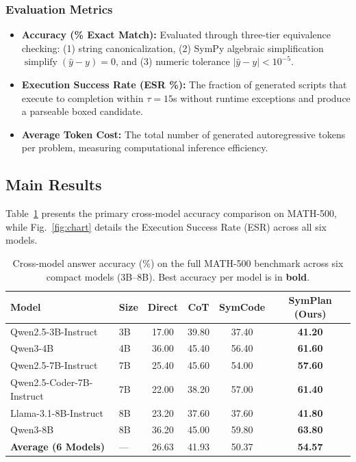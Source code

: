 \documentclass[runningheads]{llncs}
\begin{document}
\subsubsection{Evaluation Metrics}

\begin{itemize}
    \item \textbf{Accuracy (\% Exact Match):} Evaluated through three-tier equivalence checking: (1) string canonicalization, (2) SymPy algebraic simplification $\operatorname{simplify}(\hat{y} - y) = 0$, and (3) numeric tolerance $|\hat{y} - y| < 10^{-5}$.
    \item \textbf{Execution Success Rate (ESR \%):} The fraction of generated scripts that execute to completion within $\tau=15$s without runtime exceptions and produce a parseable boxed candidate.
    \item \textbf{Average Token Cost:} The total number of generated autoregressive tokens per problem, measuring computational inference efficiency.
\end{itemize}

\subsection{Main Results}
\label{sec:results}

Table~\ref{tab:mainresults} presents the primary cross-model accuracy comparison on MATH-500, while Fig.~\ref{fig:chart} details the Execution Success Rate (ESR) across all six models.

\begin{table}[t]
\centering
\caption{Cross-model answer accuracy (\%) on the full MATH-500 benchmark across six compact models (3B--8B). Best accuracy per model is in \textbf{bold}.}
\label{tab:mainresults}
\setlength{\tabcolsep}{5pt}
\small
\begin{tabular}{llcccc}
\toprule
\rowcolor{headergray}
\textbf{Model} & \textbf{Size} & \textbf{Direct} & \textbf{CoT} & \textbf{SymCode} & \textbf{SymPlan (Ours)} \\
\midrule
Qwen2.5-3B-Instruct & 3B & 17.00 & 39.80 & 37.40 & \textbf{41.20} \\
Qwen3-4B & 4B & 36.00 & 45.40 & 56.40 & \textbf{61.60} \\
Qwen2.5-7B-Instruct & 7B & 25.40 & 45.60 & 54.00 & \textbf{57.60} \\
Qwen2.5-Coder-7B-Instruct & 7B & 22.00 & 38.20 & 57.00 & \textbf{61.40} \\
Llama-3.1-8B-Instruct & 8B & 23.20 & 37.60 & 37.60 & \textbf{41.80} \\
Qwen3-8B & 8B & 36.20 & 45.00 & 59.80 & \textbf{63.80} \\
\midrule
\rowcolor{ourgreen}
\textbf{Average (6 Models)} & --- & 26.63 & 41.93 & 50.37 & \textbf{54.57} \\
\bottomrule
\end{tabular}
\end{table}
\end{document}
